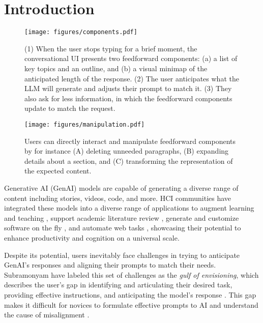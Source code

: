 \section{Introduction}
\label{section:introduction}



\begin{figure*}
    \centering
    \texttt{[image: figures/components.pdf]}
    \caption{(1) When the user stops typing for a brief moment, the conversational UI presents two feedforward components: (a) a list of key topics and an outline, and (b) a visual minimap of the anticipated length of the response. (2) The user anticipates what the LLM will generate and adjusts their prompt to match it. (3) They also ask for less information, in which the feedforward components update to match the request.}
    \label{fig:feedforward-components}
\end{figure*}

\begin{figure*}
    \centering
    \texttt{[image: figures/manipulation.pdf]}
    \caption{Users can directly interact and manipulate feedforward components by for instance (A) deleting unneeded paragraphs, (B) expanding details about a section, and (C) transforming the representation of the expected content.}
    \label{fig:feedforward-manipulation}
\end{figure*}


Generative AI (GenAI) models are capable of generating a diverse range of content including stories, videos, code, and more. HCI communities have integrated these models into a diverse range of applications to augment learning and teaching \cite{sensecape, jin2024teachAI}, support academic literature review \cite{elicit2024, kang2023synergi, fok2024qlarify, paperweaver}, generate and customize software on the fly \cite{stylette, cao2025jelly, malleableODI, priyan2024dynavis}, and automate web tasks \cite{operator2025, feng2025cocoa}, showcasing their potential to enhance productivity and cognition on a universal scale.

Despite its potential, users inevitably face challenges in trying to anticipate GenAI's responses and aligning their prompts to match their needs.
Subramonyam \etal{} have labeled this set of challenges as the \textit{gulf of envisioning}, which describes the user's gap in identifying and articulating their desired task, providing effective instructions, and anticipating the model’s response \cite{hari2024gulfenvisioning}.
This gap makes it difficult for novices to formulate effective prompts to AI and understand the cause of misalignment \cite{zamfirescu2023johnnyprompt}.

